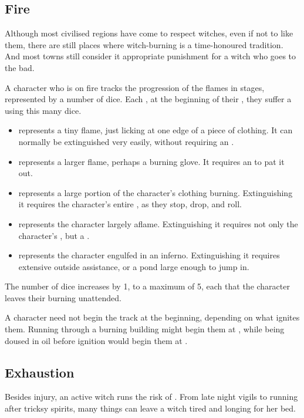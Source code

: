 \subsection{Fire}

Although most civilised regions have come to respect witches, even if not to like them, there are still places where witch-burning is a time-honoured tradition.
And most towns still consider it appropriate punishment for a witch who goes to the bad.

A character who is on fire tracks the progression of the flames in stages, represented by a number of dice.
Each {\round}, at the beginning of their {\turn}, they suffer a {\damagetest} using this many dice.
\begin{itemize}
	\item {} represents a tiny flame, just licking at one edge of a piece of clothing.
		It can normally be extinguished very easily, without requiring an {\action}.
	\item {} represents a larger flame, perhaps a burning glove.
		It requires an {\action} to pat it out.
	\item {} represents a large portion of the character's clothing burning.
		Extinguishing it requires the character's entire {\turn}, as they stop, drop, and roll.
	\item {} represents the character largely aflame.
		Extinguishing it requires not only the character's {\turn}, but a {\test}.
	\item {} represents the character engulfed in an inferno.
		Extinguishing it requires extensive outside assistance, or a pond large enough to jump in.
\end{itemize}
The number of dice increases by 1, to a maximum of 5, each {\turn} that the character leaves their burning unattended.

A character need not begin the track at the beginning, depending on what ignites them.
Running through a burning building might begin them at , while being doused in oil before ignition would begin them at .

\subsection{Exhaustion}

Besides injury, an active witch runs the risk of {\exhaustion}.
From late night vigils to running after tricksy spirits, many things can leave a witch tired and longing for her bed.


